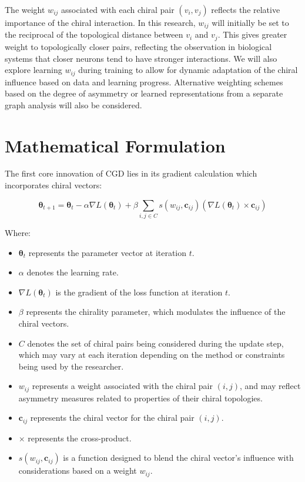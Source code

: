 \documentclass[12pt, a4paper]{article}
\begin{document}
The weight \(w_{ij}\) associated with each chiral pair \((v_i, v_j)\) reflects the relative importance of the chiral interaction. In this research,  \(w_{ij}\) will initially be set to the reciprocal of the topological distance between \(v_i\) and \(v_j\).  This gives greater weight to topologically closer pairs, reflecting the observation in biological systems that closer neurons tend to have stronger interactions. We will also explore learning \(w_{ij}\) during training to allow for dynamic adaptation of the chiral influence based on data and learning progress. Alternative weighting schemes based on the degree of asymmetry or learned representations from a separate graph analysis will also be considered.

\section{Mathematical Formulation}

The first core innovation of CGD lies in its gradient calculation which incorporates chiral vectors:

\begin{equation} \label{eq:cgd_sigmoid}
\boldsymbol{\theta}_{t+1} = \boldsymbol{\theta}_t - \alpha \nabla L(\boldsymbol{\theta}_t) + \beta \sum_{i,j \in C} s(w_{ij}, \mathbf{c}_{ij}) (\nabla L(\boldsymbol{\theta}_t) \times \mathbf{c}_{ij})
\end{equation}

Where:
\begin{itemize}
    \item \(\boldsymbol{\theta}_t\) represents the parameter vector at iteration \(t\).
    \item \(\alpha\) denotes the learning rate.
    \item \(\nabla L(\boldsymbol{\theta}_t)\) is the gradient of the loss function at iteration \(t\).
    \item \(\beta\) represents the chirality parameter, which modulates the influence of the chiral vectors.
    \item \(C\) denotes the set of chiral pairs being considered during the update step, which may vary at each iteration depending on the method or constraints being used by the researcher.
    \item \(w_{ij}\) represents a weight associated with the chiral pair \((i,j)\), and may reflect asymmetry measures related to properties of their chiral topologies.
    \item \(\mathbf{c}_{ij}\) represents the chiral vector for the chiral pair \((i, j)\).
    \item \(\times\) represents the cross-product.
    \item \(s(w_{ij},\mathbf{c}_{ij})\) is a function designed to blend the chiral vector's influence with considerations based on a weight \(w_{ij}\).
\end{itemize}
\end{document}
